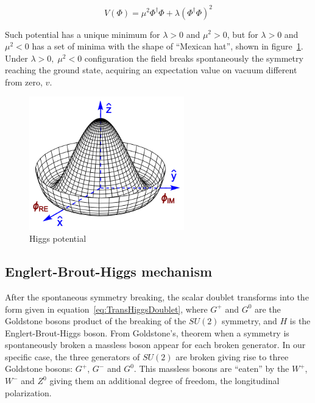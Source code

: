 \begin{equation}
  \label{eq:HiggsPotential}
  V(\Phi)=\mu^{2}\Phi^{\dagger}\Phi+\lambda(\Phi^{\dagger}\Phi)^{2}
\end{equation}

Such potential has a unique minimum for $\lambda>0$ and $\mu^{2}>0$, but for $\lambda>0$ and $\mu^{2}<0$ has a set of minima with the shape of ``Mexican hat'', shown in figure~\ref{fig:MexicanHat}. Under $\lambda>0,\;\mu^{2}<0$ configuration the field breaks spontaneously the symmetry reaching the ground state, acquiring an expectation value on vacuum different from zero, $v$. 

\begin{figure}[!Hhtbp]
  \begin{center}
    \includegraphics[width=0.6\textwidth]{figs/Mexican_hat.png}
    \caption{Higgs potential}
    \label{fig:MexicanHat}
  \end{center}
\end{figure}

\subsection{Englert-Brout-Higgs mechanism}
\label{sec:higgs}

After the spontaneous symmetry breaking, the scalar doublet transforms into the form given in equation~\ref{eq:TransHiggsDoublet}, where $G^{+}$ and $G^{0}$ are the Goldstone bosons product of the breaking of the $SU(2)$ symmetry, and $H$ is the Englert-Brout-Higgs boson. From Goldstone's, theorem when a symmetry is spontaneously broken a massless boson appear for each broken generator. In our specific case, the three generators of $SU(2)$ are broken giving rise to three Goldstone bosons: $G^{+}$, $G^{-}$ and $G^{0}$. This massless bosons are ``eaten'' by the $W^{+}$, $W^{-}$ and $Z^{0}$ giving them an additional degree of freedom, the longitudinal polarization. 

